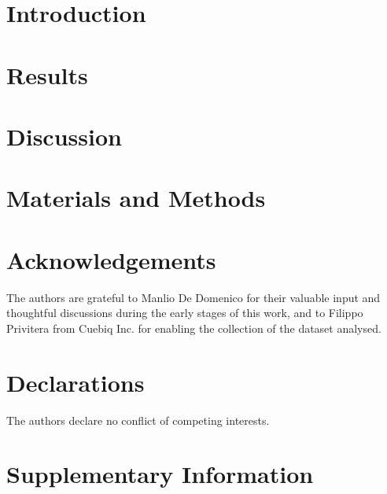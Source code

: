 \documentclass[9pt]{article}
\begin{document}
    \newpage
    
    \section*{Introduction}
        

    \section*{Results}
        

    \section*{Discussion}
        

    \section*{Materials and Methods}
        

    \section*{Acknowledgements}
    
    The authors are grateful to Manlio De Domenico for their valuable input and thoughtful discussions during the early stages of this work, and to Filippo Privitera from Cuebiq Inc. for enabling the collection of the dataset analysed.
    
    \section*{Declarations}
    The authors declare no conflict of competing interests.    

    \newpage
    
    
    
    \newpage    
    \section*{Supplementary Information}
       
\end{document}
